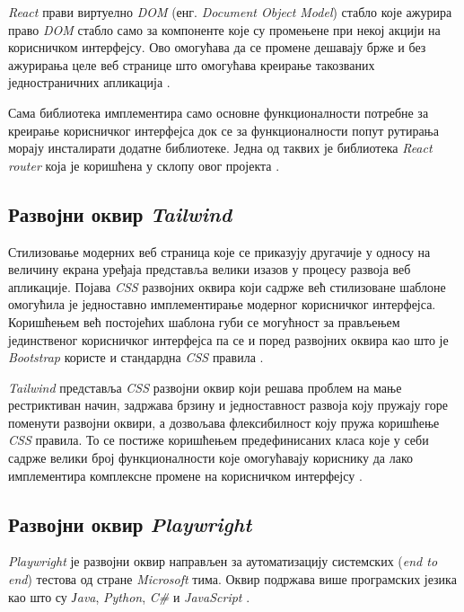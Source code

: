 \documentclass[12pt,oneside]{memoir}
\begin{document}
\textit{React} прави виртуелно \textit{DOM} (енг. \textit{Document Object Model}) стабло које ажурира право \textit{DOM} стабло само за компоненте које су промењене при некој акцији на корисничком интерфејсу. Ово омогућава да се промене дешавају брже и без ажурирања целе веб странице што омогућава креирање такозваних једностраничних апликација \cite{react}. 

Сама библиотека имплементира само основне функционалности потребне за креирање корисничког интерфејса док се за функционалности попут рутирања морају инсталирати додатне библиотеке. Једна од таквих је библиотека \textit{React router} која је коришћена у склопу овог пројекта \cite{reactRouter}.

\subsection{Развојни оквир \textit{Tailwind} }

Стилизовање модерних веб страница које се приказују другачије у односу на величину екрана уређаја представља велики изазов у процесу развоја веб апликације. Појава \textit{CSS} развојних оквира који садрже већ стилизоване шаблоне омогућила је једноставно имплементирање модерног корисничког интерфејса. Коришћењем већ постојећих шаблона губи се могућност за прављењем јединственог корисничког интерфејса па се и поред развојних оквира као што је \textit{Bootstrap} користе и стандардна \textit{CSS} правила \cite{bootstrap}.

\textit{Tailwind} представља \textit{CSS} развојни оквир који решава проблем на мање рестриктиван начин, задржава брзину и једноставност развоја коју пружају горе поменути развојни оквири, а дозвољава флексибилност коју пружа коришћење \textit{CSS} правила. То се постиже коришћењем предефинисаних класа које у себи садрже велики број функционалности које омогућавају кориснику да лако имплементира комплексне промене на корисничком интерфејсу \cite{tailwind}.


\subsection{Развојни оквир \textit{Playwright}}

\textit{Playwright} је развојни оквир направљен за аутоматизацију системских (\textit{end to end}) тестова од стране \textit{Microsoft} тима. Оквир подржава више програмских језика као што су \textit{Јava}, \textit{Python}, \textit{C\#}  и \textit{JavaScript} \cite{playwright}.
\end{document}
